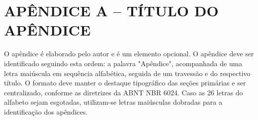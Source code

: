 \documentclass[
	article,             %
	12pt,                %
	oneside,             %
	a4paper,             %
	english,             %
	brazil,              %
	sumario=tradicional
]{abntex2}
\begin{document}
\renewcommand{\bibname}{}



\renewcommand{\glossaryname}{\textbf{GLOSSÁRIO}}
\renewcommand{\glossarypreamble}{
	Elemento opcional. Deve ser elaborado em ordem alfabética.\\ \\
}



\printglossaries

\vspace{\onelineskip}
\vspace{\onelineskip}



\chapter*{\textbf{APÊNDICE A – TÍTULO DO APÊNDICE}}

O apêndice é elaborado pelo autor e é um elemento opcional. O apêndice deve ser identificado seguindo esta ordem: a palavra "Apêndice", acompanhada de uma letra maiúscula em sequência alfabética, seguida de um travessão e do respectivo título. O formato deve manter o destaque tipográfico das seções primárias e ser centralizado, conforme as diretrizes da ABNT NBR 6024. Caso as 26 letras do alfabeto sejam esgotadas, utilizam-se letras maiúsculas dobradas para a identificação dos apêndices.
\end{document}
